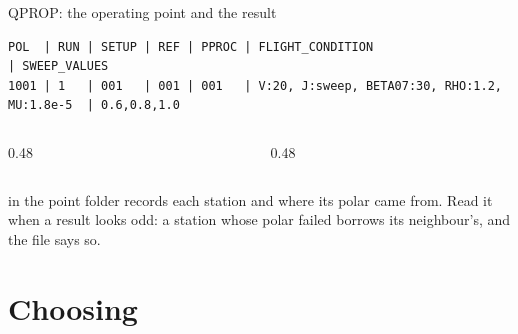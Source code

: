 \begin{frame}[fragile]{QPROP: the operating point and the result}
\begin{lstlisting}
POL  | RUN | SETUP | REF | PPROC | FLIGHT_CONDITION                              | SWEEP_VALUES
1001 | 1   | 001   | 001 | 001   | V:20, J:sweep, BETA07:30, RHO:1.2, MU:1.8e-5  | 0.6,0.8,1.0
\end{lstlisting}
\begin{columns}[T]
\begin{column}{0.48\textwidth}
\end{column}
\begin{column}{0.48\textwidth}
\end{column}
\end{columns}
\vspace{1mm}
{\small{} in the point folder records each station and
where its polar came from. Read it when a result looks odd: a station whose
polar failed borrows its neighbour's, and the file says so.\par}
\end{frame}

\section{Choosing}

